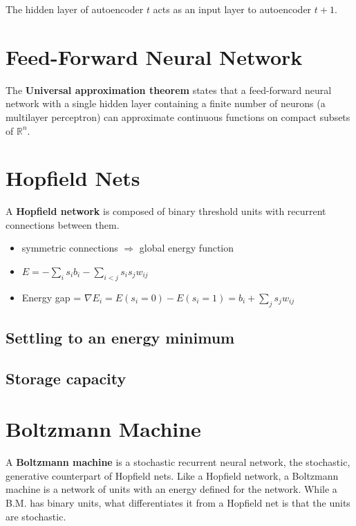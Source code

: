 \documentclass{article}
\newcommand{\grad}{\nabla}
\begin{document}
\noindent
The hidden layer of autoencoder $t$ acts as an input layer to autoencoder $t+1$.



\section{Feed-Forward Neural Network}

The \textbf{Universal approximation theorem} states that a feed-forward neural network with a single hidden layer containing a finite number of neurons (a multilayer perceptron) can approximate continuous functions on compact subsets of $\mathbb{R}^n$.

\section{Hopfield Nets}
A \textbf{Hopfield network} is composed of binary threshold units with recurrent connections between them.

\begin{itemize}
	\item symmetric connections $\Rightarrow$ global energy function
	\item $\displaystyle E = - \sum_i s_i b_i - \sum_{i < j} s_i s_j w_{ij}$
	\item Energy gap = $\displaystyle \grad E_i = E(s_i = 0) - E(s_i = 1) = b_i + \sum_j s_j w_{ij}$
\end{itemize}

\subsection{Settling to an energy minimum}
\subsection{Storage capacity}






\section{Boltzmann Machine}
A \textbf{Boltzmann machine} is a stochastic recurrent neural network, the stochastic, generative counterpart of Hopfield nets.  Like a Hopfield network, a Boltzmann machine is a network of units with an energy defined for the network.  While a B.M. has binary units, what differentiates it from a Hopfield net is that the units are stochastic.  
\end{document}
